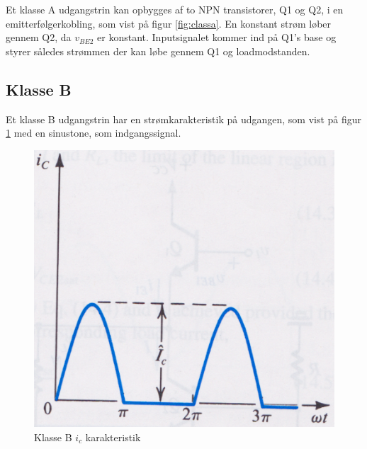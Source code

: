 Et klasse A udgangstrin kan opbygges af to NPN transistorer, Q1 og Q2, i en emitterfølgerkobling, som vist på figur \ref{fig:classa}. En konstant strøm løber gennem Q2, da $v_{BE2}$ er konstant. Inputsignalet kommer ind på Q1's base og styrer således strømmen der kan løbe gennem Q1 og loadmodstanden. 



\subsection{Klasse B}

Et klasse B udgangstrin har en strømkarakteristik på udgangen, som vist på figur \ref{fig:klasseb} med en sinustone, som indgangssignal. 

\begin{figure}[ht]
\begin{minipage}[b]{0.5\linewidth}
\centering
\includegraphics[scale=.35]{valg_af_loesning/klasser/klasseb.png}
\caption{Klasse B $i_c$ karakteristik}
\label{fig:klasseb}
\end{minipage}
\hspace{0.5cm}
\begin{minipage}[b]{0.5\linewidth}
\centering

\end{minipage}
\end{figure}
